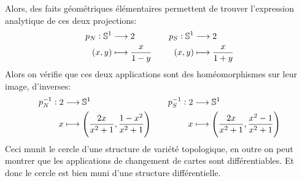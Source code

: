    Alors, des faits géométriques élémentaires permettent de trouver l'expression analytique de ces deux projections:
   \[ 
      \begin{aligned}
         p_N : \mathbb{S}^1 &\longrightarrow 2 \\
         (x, y) &\longmapsto \frac{x}{1-y}
      \end{aligned} \quad\quad
      \begin{aligned}
         p_S : \mathbb{S}^1 &\longrightarrow 2 \\
         (x, y) &\longmapsto \frac{x}{1+y}
      \end{aligned}
   \]
   Alors on vérifie que ces deux applications sont des homéomorphismes sur leur image, d'inverses:
   \[ 
      \begin{aligned}
         p_N^{-1} : 2 &\longrightarrow \mathbb{S}^1 \\
         x &\longmapsto \left(\frac{2x}{x^2+1}, \frac{1-x^2}{x^2+1}\right)
      \end{aligned} \quad\quad
      \begin{aligned}
         p_S^{-1} : 2 &\longrightarrow \mathbb{S}^1 \\
         x &\longmapsto \left(\frac{2x}{x^2+1}, \frac{x^2-1}{x^2+1}\right)
      \end{aligned}
   \]
   Ceci munit le cercle d'une structure de variété topologique, en outre on peut montrer que les applications de changement de cartes sont différentiables. Et donc le cercle est bien muni d'une structure différentielle.
